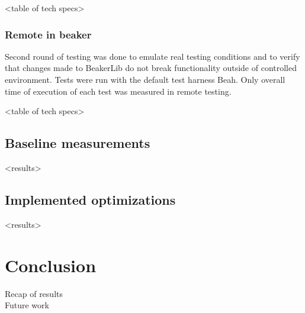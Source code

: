 <table of tech specs>

\subsection{Remote in beaker}
Second round of testing was done to emulate real testing conditions and to verify that changes made to BeakerLib do not break functionality outside of controlled environment. Tests were run with the default test harness Beah. Only overall time of execution of each test was measured in remote testing.

<table of tech specs>

\section{Baseline measurements}
<results>


\section{Implemented optimizations}
<results>

\chapter{Conclusion}
Recap of results
\\
Future work


